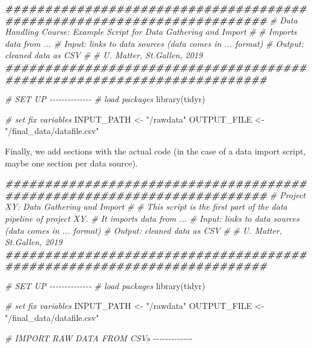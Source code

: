 \documentclass[
  12pt,
]{style/krantz}
\newenvironment{Shaded}{\begin{snugshade}}{\end{snugshade}}
\newcommand{\CommentTok}[1]{\textcolor[rgb]{0.56,0.35,0.01}{\textit{#1}}}
\newcommand{\DocumentationTok}[1]{\textcolor[rgb]{0.56,0.35,0.01}{\textbf{\textit{#1}}}}
\newcommand{\FunctionTok}[1]{\textcolor[rgb]{0.00,0.00,0.00}{#1}}
\newcommand{\NormalTok}[1]{#1}
\newcommand{\OtherTok}[1]{\textcolor[rgb]{0.56,0.35,0.01}{#1}}
\newcommand{\StringTok}[1]{\textcolor[rgb]{0.31,0.60,0.02}{#1}}
\begin{document}
\begin{Shaded}
\begin{Highlighting}[]
\DocumentationTok{\#\#\#\#\#\#\#\#\#\#\#\#\#\#\#\#\#\#\#\#\#\#\#\#\#\#\#\#\#\#\#\#\#\#\#\#\#\#\#\#\#\#\#\#\#\#\#\#\#\#\#\#\#\#\#\#\#\#\#\#\#\#\#\#\#\#\#\#\#\#\#}
\CommentTok{\# Data Handling Course: Example Script for Data Gathering and Import}
\CommentTok{\#}
\CommentTok{\# Imports data from ...}
\CommentTok{\# Input: links to data sources (data comes in ... format)}
\CommentTok{\# Output: cleaned data as CSV}
\CommentTok{\#}
\CommentTok{\# U. Matter, St.Gallen, 2019}
\DocumentationTok{\#\#\#\#\#\#\#\#\#\#\#\#\#\#\#\#\#\#\#\#\#\#\#\#\#\#\#\#\#\#\#\#\#\#\#\#\#\#\#\#\#\#\#\#\#\#\#\#\#\#\#\#\#\#\#\#\#\#\#\#\#\#\#\#\#\#\#\#\#\#\#}


\CommentTok{\# SET UP {-}{-}{-}{-}{-}{-}{-}{-}{-}{-}{-}{-}{-}{-}}
\CommentTok{\# load packages}
\FunctionTok{library}\NormalTok{(tidyr)}

\CommentTok{\# set fix variables}
\NormalTok{INPUT\_PATH }\OtherTok{\textless{}{-}} \StringTok{"/rawdata"}
\NormalTok{OUTPUT\_FILE }\OtherTok{\textless{}{-}} \StringTok{"/final\_data/datafile.csv"}
\end{Highlighting}
\end{Shaded}

Finally, we add sections with the actual code (in the case of a data import script, maybe one section per data source).

\begin{Shaded}
\begin{Highlighting}[]
\DocumentationTok{\#\#\#\#\#\#\#\#\#\#\#\#\#\#\#\#\#\#\#\#\#\#\#\#\#\#\#\#\#\#\#\#\#\#\#\#\#\#\#\#\#\#\#\#\#\#\#\#\#\#\#\#\#\#\#\#\#\#\#\#\#\#\#\#\#\#\#\#\#\#\#}
\CommentTok{\# Project XY: Data Gathering and Import}
\CommentTok{\#}
\CommentTok{\# This script is the first part of the data pipeline of project XY.}
\CommentTok{\# It imports data from ...}
\CommentTok{\# Input: links to data sources (data comes in ... format)}
\CommentTok{\# Output: cleaned data as CSV}
\CommentTok{\#}
\CommentTok{\# U. Matter, St.Gallen, 2019}
\DocumentationTok{\#\#\#\#\#\#\#\#\#\#\#\#\#\#\#\#\#\#\#\#\#\#\#\#\#\#\#\#\#\#\#\#\#\#\#\#\#\#\#\#\#\#\#\#\#\#\#\#\#\#\#\#\#\#\#\#\#\#\#\#\#\#\#\#\#\#\#\#\#\#\#}


\CommentTok{\# SET UP {-}{-}{-}{-}{-}{-}{-}{-}{-}{-}{-}{-}{-}{-}}
\CommentTok{\# load packages}
\FunctionTok{library}\NormalTok{(tidyr)}

\CommentTok{\# set fix variables}
\NormalTok{INPUT\_PATH }\OtherTok{\textless{}{-}} \StringTok{"/rawdata"}
\NormalTok{OUTPUT\_FILE }\OtherTok{\textless{}{-}} \StringTok{"/final\_data/datafile.csv"}


\CommentTok{\# IMPORT RAW DATA FROM CSVs {-}{-}{-}{-}{-}{-}{-}{-}{-}{-}{-}{-}{-}}
\end{Highlighting}
\end{Shaded}
\end{document}
